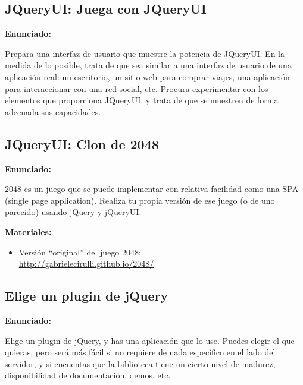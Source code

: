 \subsection{JQueryUI: Juega con JQueryUI}
\label{subsec:otras-jquery-juega}

\textbf{Enunciado:}

Prepara una interfaz de usuario que muestre la potencia de JQueryUI. En la medida de lo posible, trata de que sea similar a una interfaz de usuario de una aplicación real: un escritorio, un sitio web para comprar viajes, una aplicación para interaccionar con una red social, etc. Procura experimentar con los elementos que proporciona JQueryUI, y trata de que se muestren de forma adecuada sus capacidades.

\subsection{JQueryUI: Clon de 2048}
\label{subsec:otras-jquery-2048}

\textbf{Enunciado:}

2048 es un juego que se puede implementar con relativa facilidad como una SPA (single page application). Realiza tu propia versión de ese juego (o de uno parecido) usando jQuery y jQueryUI.

\textbf{Materiales:}

\begin{itemize}
\item Versión ``original'' del juego 2048: \\
  \url{http://gabrielecirulli.github.io/2048/}
\end{itemize}

\subsection{Elige un plugin de jQuery}
\label{subsec:otras-jquery-plugin}

\textbf{Enunciado:}

Elige un plugin de jQuery, y has una aplicación que lo use. Puedes elegir el que quieras, pero será más fácil si no requiere de nada específico en el lado del servidor, y si encuentas que la biblioteca tiene un cierto nivel de madurez, disponibilidad de documentación, demos, etc.

